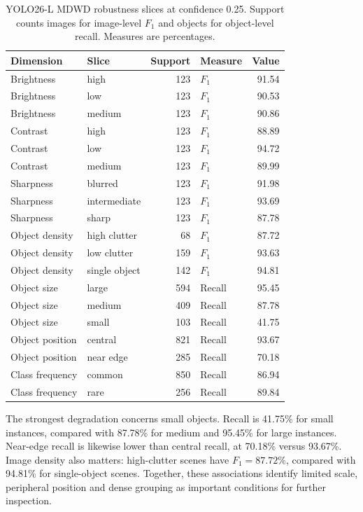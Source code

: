 \begin{table}[htbp]
\centering
\small
\caption{YOLO26-L \gls{MDWD} robustness slices at confidence 0.25. Support counts images for image-level $F_1$ and objects for object-level recall. Measures are percentages.}
\label{tab:ev-robustness}
\renewcommand{\arraystretch}{1.15}
\begin{tabularx}{\textwidth}{@{}>{\raggedright\arraybackslash}X>{\raggedright\arraybackslash}Xrlr@{}}
\toprule
Dimension & Slice & Support & Measure & Value \\
\midrule
Brightness & high & 123 & $F_1$ & 91.54 \\
Brightness & low & 123 & $F_1$ & 90.53 \\
Brightness & medium & 123 & $F_1$ & 90.86 \\
Contrast & high & 123 & $F_1$ & 88.89 \\
Contrast & low & 123 & $F_1$ & 94.72 \\
Contrast & medium & 123 & $F_1$ & 89.99 \\
Sharpness & blurred & 123 & $F_1$ & 91.98 \\
Sharpness & intermediate & 123 & $F_1$ & 93.69 \\
Sharpness & sharp & 123 & $F_1$ & 87.78 \\
Object density & high clutter & 68 & $F_1$ & 87.72 \\
Object density & low clutter & 159 & $F_1$ & 93.63 \\
Object density & single object & 142 & $F_1$ & 94.81 \\
Object size & large & 594 & Recall & 95.45 \\
Object size & medium & 409 & Recall & 87.78 \\
Object size & small & 103 & Recall & 41.75 \\
Object position & central & 821 & Recall & 93.67 \\
Object position & near edge & 285 & Recall & 70.18 \\
Class frequency & common & 850 & Recall & 86.94 \\
Class frequency & rare & 256 & Recall & 89.84 \\
\bottomrule
\end{tabularx}
\end{table}


The strongest degradation concerns small objects. Recall is 41.75\% for small instances, compared with 87.78\% for medium and 95.45\% for large instances. Near-edge recall is likewise lower than central recall, at 70.18\% versus 93.67\%. Image density also matters: high-clutter scenes have \(F_1=87.72\%\), compared with 94.81\% for single-object scenes. Together, these associations identify limited scale, peripheral position and dense grouping as important conditions for further inspection.

